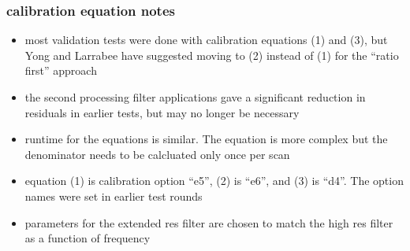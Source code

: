 \documentclass[11pt]{beamer}
\begin{document}
\begin{frame}
\frametitle{calibration equation notes}

\begin{itemize}
  \item most {\ccast} validation tests were done with calibration
    equations (1) and (3), but Yong and Larrabee have suggested
    moving to (2) instead of (1) for the ``ratio first'' approach

  \item the second processing filter applications gave a significant
    reduction in residuals in earlier tests, but may no longer be
    necessary

  \item runtime for the equations is similar.  The {\noaa} equation 
    is more complex but the denominator needs to be calcluated only
    once per scan

  \item equation (1) is {\ccast} calibration option ``e5'', (2) is
    ``e6'', and (3) is ``d4''.  The {\ccast} option names were set
    in earlier test rounds

  \item parameters for the {\umbc} extended res {\atbd} filter are
    chosen to match the {\noaa} high res filter as a function of
    frequency

\end{itemize}

\end{frame}
\end{document}
